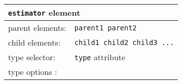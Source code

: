 \begin{table}[h]
\begin{center}
\begin{tabularx}{\textwidth}{l l l l l l }
\hline
\multicolumn{6}{l}{\texttt{estimator} element} \\
\hline
\multicolumn{2}{l}{parent elements:} & \multicolumn{4}{l}{\texttt{parent1 parent2}}\\
\multicolumn{2}{l}{child  elements:} & \multicolumn{4}{l}{\texttt{child1 child2 child3 ...}}\\
\multicolumn{2}{l}{type   selector:} & \multicolumn{4}{l}{\texttt{type} attribute}\\
\multicolumn{2}{l}{type   options :} & \multicolumn{4}{l}{}\\
  \hline
\end{tabularx}
\end{center}
\end{table}




